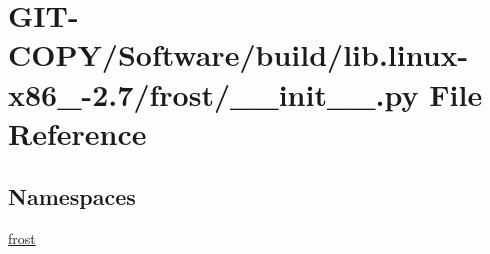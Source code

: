 \hypertarget{GIT-COPY_2Software_2build_2lib_8linux-x86__64-2_87_2frost_2____init_____8py}{}\section{G\+I\+T-\/\+C\+O\+P\+Y/\+Software/build/lib.linux-\/x86\+\_-\/2.7/frost/\+\_\+\+\_\+init\+\_\+\+\_\+.py File Reference}
\label{GIT-COPY_2Software_2build_2lib_8linux-x86__64-2_87_2frost_2____init_____8py}
\subsection*{Namespaces}
\begin{DoxyCompactItemize}
\item 
 \hyperlink{namespacefrost}{frost}
\end{DoxyCompactItemize}
